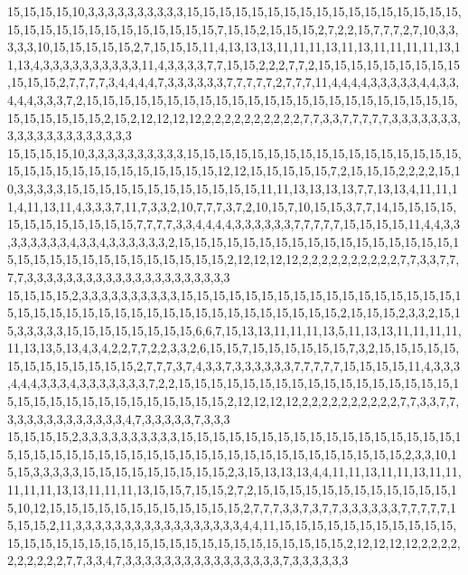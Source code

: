 15,15,15,15,10,3,3,3,3,3,3,3,3,3,3,15,15,15,15,15,15,15,15,15,15,15,15,15,15,15,15,15,15,15,15,15,15,15,15,15,15,15,15,15,15,7,15,15,2,15,15,15,2,7,2,2,15,7,7,7,2,7,10,3,3,3,3,3,10,15,15,15,15,15,2,7,15,15,15,11,4,13,13,13,11,11,11,13,11,13,11,11,11,11,13,11,13,4,3,3,3,3,3,3,3,3,3,3,11,4,3,3,3,3,7,7,15,15,2,2,2,7,7,2,15,15,15,15,15,15,15,15,15,15,15,15,2,7,7,7,7,3,4,4,4,4,7,3,3,3,3,3,3,7,7,7,7,7,2,7,7,7,11,4,4,4,4,3,3,3,3,3,4,4,3,3,4,4,4,3,3,3,7,2,15,15,15,15,15,15,15,15,15,15,15,15,15,15,15,15,15,15,15,15,15,15,15,15,15,15,15,15,15,2,15,2,12,12,12,12,2,2,2,2,2,2,2,2,2,2,7,7,3,3,7,7,7,7,7,3,3,3,3,3,3,3,3,3,3,3,3,3,3,3,3,3,3,3,3
15,15,15,15,10,3,3,3,3,3,3,3,3,3,3,15,15,15,15,15,15,15,15,15,15,15,15,15,15,15,15,15,15,15,15,15,15,15,15,15,15,15,15,15,15,12,12,15,15,15,15,15,7,2,15,15,15,2,2,2,2,15,10,3,3,3,3,3,15,15,15,15,15,15,15,15,15,15,15,15,11,11,13,13,13,13,7,7,13,13,4,11,11,11,4,11,13,11,4,3,3,3,7,11,7,3,3,2,10,7,7,7,3,7,2,10,15,7,10,15,15,3,7,7,14,15,15,15,15,15,15,15,15,15,15,15,15,7,7,7,7,3,3,4,4,4,4,3,3,3,3,3,3,7,7,7,7,7,15,15,15,15,11,4,4,3,3,3,3,3,3,3,3,4,3,3,4,3,3,3,3,3,3,2,15,15,15,15,15,15,15,15,15,15,15,15,15,15,15,15,15,15,15,15,15,15,15,15,15,15,15,15,15,15,15,2,12,12,12,12,2,2,2,2,2,2,2,2,2,2,7,7,3,3,7,7,7,7,3,3,3,3,3,3,3,3,3,3,3,3,3,3,3,3,3,3,3,3,3
15,15,15,15,2,3,3,3,3,3,3,3,3,3,3,15,15,15,15,15,15,15,15,15,15,15,15,15,15,15,15,15,15,15,15,15,15,15,15,15,15,15,15,15,15,15,15,15,15,15,15,15,15,2,15,15,15,2,3,3,2,15,15,3,3,3,3,3,15,15,15,15,15,15,15,15,6,6,7,15,13,13,11,11,11,13,5,11,13,13,11,11,11,11,11,13,13,5,13,4,3,4,2,2,7,7,2,2,3,3,2,6,15,15,7,15,15,15,15,15,15,7,3,2,15,15,15,15,15,15,15,15,15,15,15,15,15,2,7,7,7,3,7,4,3,3,7,3,3,3,3,3,3,7,7,7,7,7,15,15,15,15,11,4,3,3,3,4,4,4,3,3,3,4,3,3,3,3,3,3,3,7,2,2,15,15,15,15,15,15,15,15,15,15,15,15,15,15,15,15,15,15,15,15,15,15,15,15,15,15,15,15,15,15,15,2,12,12,12,12,2,2,2,2,2,2,2,2,2,2,7,7,3,3,7,7,3,3,3,3,3,3,3,3,3,3,3,3,4,7,3,3,3,3,3,7,3,3,3
15,15,15,15,2,3,3,3,3,3,3,3,3,3,3,15,15,15,15,15,15,15,15,15,15,15,15,15,15,15,15,15,15,15,15,15,15,15,15,15,15,15,15,15,15,15,15,15,15,15,15,15,15,15,15,15,15,2,3,3,10,15,15,3,3,3,3,3,15,15,15,15,15,15,15,15,15,2,3,15,13,13,13,4,4,11,11,13,11,11,13,11,11,11,11,11,13,13,11,11,11,13,15,15,7,15,15,2,7,2,15,15,15,15,15,15,15,15,15,15,15,15,15,10,12,15,15,15,15,15,15,15,15,15,15,15,15,2,7,7,7,3,3,7,3,7,7,3,3,3,3,3,3,7,7,7,7,7,15,15,15,2,11,3,3,3,3,3,3,3,3,3,3,3,3,3,3,3,3,3,4,4,11,15,15,15,15,15,15,15,15,15,15,15,15,15,15,15,15,15,15,15,15,15,15,15,15,15,15,15,15,15,15,15,15,2,12,12,12,12,2,2,2,2,2,2,2,2,2,2,7,7,3,3,4,7,3,3,3,3,3,3,3,3,3,3,3,3,3,3,3,3,7,3,3,3,3,3,3
